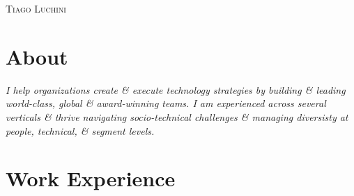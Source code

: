 \documentclass[a4paper,10pt]{article}
\begin{document}
\pagestyle{fancy} %

\fancyhf{}

\renewcommand{\headrulewidth}{0pt}
\renewcommand{\footrulewidth}{1pt}


\par{\centering
  {\Huge\textsc{Tiago Luchini}}\smallskip\par}




\section{About}
\emph{I help organizations create \& execute technology strategies by
building \& leading world-class, global \& award-winning teams. I am
experienced across several verticals \& thrive navigating
socio-technical challenges \& managing diversisty at people,
technical, \& segment levels.}

\section{Work Experience}
\end{document}
